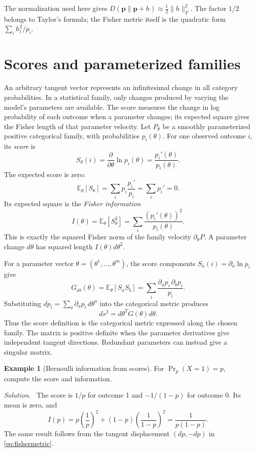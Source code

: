 \documentclass[11pt,oneside,openany]{book}
\theoremstyle{definition}
\newtheorem{example}{Example}[chapter]
\theoremstyle{remark}
\newenvironment{solution}{\par\smallskip\noindent\textit{Solution.}\ }{\par\smallskip}
\newcommand{\E}{\mathbb{E}}
\newcommand{\p}{\mathbf{p}}
\numberwithin{equation}{chapter}
\begin{document}
The normalization used here gives $D(\p\|\p+h)\approx\tfrac12\|h\|_F^2$. The factor $1/2$ belongs to Taylor's formula; the Fisher metric itself is the quadratic form $\sum_i h_i^2/p_i$.

\section{Scores and parameterized families}
An arbitrary tangent vector represents an infinitesimal change in all category probabilities. In a statistical family, only changes produced by varying the model's parameters are available. The score measures the change in log probability of each outcome when a parameter changes; its expected square gives the Fisher length of that parameter velocity.
Let $P_\theta$ be a smoothly parameterized positive categorical family, with probabilities $p_i(\theta)$. For one observed outcome $i$, its \emph{score} is
\[
S_\theta(i)=\frac{\partial}{\partial\theta}\ln p_i(\theta)
=\frac{p_i'(\theta)}{p_i(\theta)}.
\]
The expected score is zero:
\[
\E_\theta[S_\theta]=\sum_i p_i\frac{p_i'}{p_i}=\sum_i p_i'=0.
\]
Its expected square is the \emph{Fisher information}
\begin{equation}\label{eq:scoreinfo}
I(\theta)=\E_\theta[S_\theta^2]=\sum_i\frac{(p_i'(\theta))^2}{p_i(\theta)}.
\end{equation}
This is exactly the squared Fisher norm of the family velocity $\partial_\theta P$. A parameter change $d\theta$ has squared length $I(\theta)d\theta^2$.

For a parameter vector $\theta=(\theta^1,\ldots,\theta^m)$, the score components $S_a(i)=\partial_a\ln p_i$ give
\begin{equation}\label{eq:informationmatrix}
G_{ab}(\theta)=\E_\theta[S_aS_b]
=\sum_i\frac{\partial_ap_i\,\partial_bp_i}{p_i}.
\end{equation}
Substituting $dp_i=\sum_a\partial_ap_i\,d\theta^a$ into the categorical metric produces
\[
ds^2=d\theta^TG(\theta)d\theta.
\]
Thus the score definition is the categorical metric expressed along the chosen family. The matrix is positive definite when the parameter derivatives give independent tangent directions. Redundant parameters can instead give a singular matrix.

\begin{example}[Bernoulli information from scores]
For $\Pr_p(X=1)=p$, compute the score and information.
\begin{solution}
The score is $1/p$ for outcome 1 and $-1/(1-p)$ for outcome 0. Its mean is zero, and
\[
I(p)=p\left(\frac1p\right)^2+(1-p)\left(\frac1{1-p}\right)^2
=\frac1{p(1-p)}.
\]
The same result follows from the tangent displacement $(dp,-dp)$ in \eqref{eq:fishermetric}.
\end{solution}
\end{example}
\end{document}
